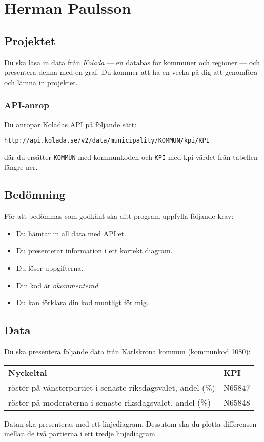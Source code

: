 \section{Herman Paulsson}

\subsection{Projektet}

Du ska läsa in data från \textit{Kolada} --- en databas för kommuner och regioner --- och presentera denna med en graf. Du kommer att ha en vecka på dig att genomföra och lämna in projektet.

\subsubsection{API-anrop}

Du anropar Koladas API på följande sätt:

\texttt{http://api.kolada.se/v2/data/municipality/KOMMUN/kpi/KPI}

\noindent där du ersätter \texttt{KOMMUN} med kommunkoden och \texttt{KPI} med kpi-värdet från tabellen längre ner.

\subsection{Bedömning}

För att bedömmas som godkänt ska ditt program uppfylla följande krav:

\begin{itemize}
	\item Du hämtar in all data med API:et.
	\item Du presenterar information i ett korrekt diagram.
	\item Du löser uppgifterna.
	\item Din kod är \textit{okommenterad}.
	\item Du kan förklara din kod muntligt för mig.
\end{itemize}

\subsection{Data}

Du ska presentera följande data från Karlskrona kommun (kommunkod 1080):

\begin{center}
	\begin{tabular}{ll}
		\rowcolor{blue!25}
		\textbf{Nyckeltal} & \textbf{KPI}\\
		röster på vänsterpartiet i senaste riksdagsvalet, andel (\%) & N65847\\
		röster på moderaterna i senaste riksdagsvalet, andel (\%) & N65848
	\end{tabular}
\end{center}

Datan ska presenteras med ett linjediagram. Dessutom ska du plotta differensen mellan de två partierna i ett tredje linjediagram.

\clearpage